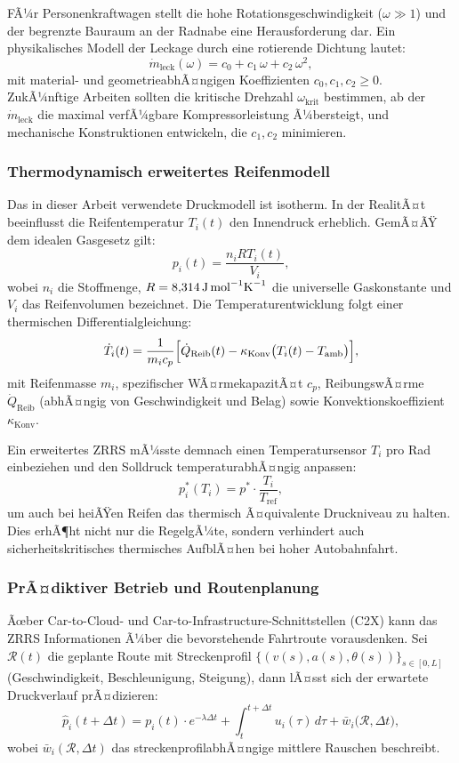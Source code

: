 ﻿\documentclass[a4paper,12pt]{article}
\theoremstyle{definition}
\begin{document}
FÃ¼r Personenkraftwagen stellt die hohe Rotationsgeschwindigkeit ($\omega \gg 1$)
und der begrenzte Bauraum an der Radnabe eine Herausforderung dar. Ein
physikalisches Modell der Leckage durch eine rotierende Dichtung lautet:
\[
    \dot{m}_{\text{leck}}(\omega) = c_0 + c_1\,\omega + c_2\,\omega^2,
\]
mit material- und geometrieabhÃ¤ngigen Koeffizienten $c_0, c_1, c_2 \geq 0$.
ZukÃ¼nftige Arbeiten sollten die kritische Drehzahl $\omega_{\text{krit}}$
bestimmen, ab der $\dot{m}_{\text{leck}}$ die maximal verfÃ¼gbare
Kompressorleistung Ã¼bersteigt, und mechanische Konstruktionen entwickeln,
die $c_1, c_2$ minimieren.

\subsubsection{Thermodynamisch erweitertes Reifenmodell}

Das in dieser Arbeit verwendete Druckmodell ist isotherm. In der RealitÃ¤t
beeinflusst die Reifentemperatur $T_i(t)$ den Innendruck erheblich. GemÃ¤ÃŸ
dem idealen Gasgesetz gilt:
\[
    p_i(t) = \frac{n_i R T_i(t)}{V_i},
\]
wobei $n_i$ die Stoffmenge, $R = 8{,}314\,\text{J\,mol}^{-1}\text{K}^{-1}$
die universelle Gaskonstante und $V_i$ das Reifenvolumen bezeichnet.
Die Temperaturentwicklung folgt einer thermischen Differentialgleichung:
\[
    \dot{T}_i(t) = \frac{1}{m_i c_p}\Bigl[\dot{Q}_{\text{Reib}}(t)
    - \kappa_{\text{Konv}}\bigl(T_i(t) - T_{\text{amb}}\bigr)\Bigr],
\]
mit Reifenmasse $m_i$, spezifischer WÃ¤rmekapazitÃ¤t $c_p$, ReibungswÃ¤rme
$\dot{Q}_{\text{Reib}}$ (abhÃ¤ngig von Geschwindigkeit und Belag) sowie
Konvektionskoeffizient $\kappa_{\text{Konv}}$.

Ein erweitertes ZRRS mÃ¼sste demnach einen Temperatursensor $T_i$ pro Rad
einbeziehen und den Solldruck temperaturabhÃ¤ngig anpassen:
\[
    p^*_i(T_i) = p^* \cdot \frac{T_i}{T_{\text{ref}}},
\]
um auch bei heiÃŸen Reifen das thermisch Ã¤quivalente Druckniveau zu halten.
Dies erhÃ¶ht nicht nur die RegelgÃ¼te, sondern verhindert auch sicherheitskritisches
thermisches AufblÃ¤hen bei hoher Autobahnfahrt.

\subsubsection{PrÃ¤diktiver Betrieb und Routenplanung}

Ãœber Car-to-Cloud- und Car-to-Infrastructure-Schnittstellen (C2X) kann das
ZRRS Informationen Ã¼ber die bevorstehende Fahrtroute vorausdenken. Sei
$\mathcal{R}(t)$ die geplante Route mit Streckenprofil
$\{(v(s), a(s), \theta(s))\}_{s \in [0, L]}$ (Geschwindigkeit, Beschleunigung,
Steigung), dann lÃ¤sst sich der erwartete Druckverlauf prÃ¤dizieren:
\[
    \hat{p}_i(t + \Delta t) = p_i(t) \cdot e^{-\lambda \Delta t}
    + \int_t^{t+\Delta t} u_i(\tau)\, d\tau
    + \bar{w}_i\bigl(\mathcal{R}, \Delta t\bigr),
\]
wobei $\bar{w}_i(\mathcal{R}, \Delta t)$ das streckenprofil\-abhÃ¤ngige
mittlere Rauschen beschreibt.
\end{document}
